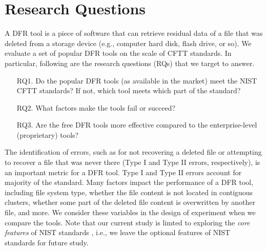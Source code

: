 \section{Research Questions}

A DFR tool is a piece of software that can retrieve residual data of a file that was deleted 
from a storage device (e.g., computer hard disk, flash drive, or so). We evaluate a set of 
popular DFR tools on the scale of CFTT standards. 
In particular, following are the research questions (RQs) that we target to answer. 

\begin{itemize}
\item[RQ1.] Do the popular DFR tools (as available in the market) meet the NIST CFTT standards? 
If not, which tool meets which part of the standard? 

\item[RQ2.] What factors make the tools fail or succeed?

\item[RQ3.] Are the free DFR tools more effective compared to the enterprise-level (proprietary) tools?
\end{itemize}

The identification of errors, such as for not recovering a deleted file or attempting to recover a file that was never there 
(Type I and Type II errors, respectively), is an important metric for a DFR tool. 
Type I and Type II errors account for majority of the standard. Many factors impact the performance of a DFR tool, 
including file system type, whether the file content is not located in contiguous clusters, whether 
some part of the deleted file content is overwritten by another file, and more.
We consider these variables in the design of experiment when we compare the tools.
Note that our current study is limted to exploring the \emph{core features} of NIST standards \cite{cftt:nist}, 
i.e., we leave the optional features \cite{cftt:nist} of NIST standards for future study.

